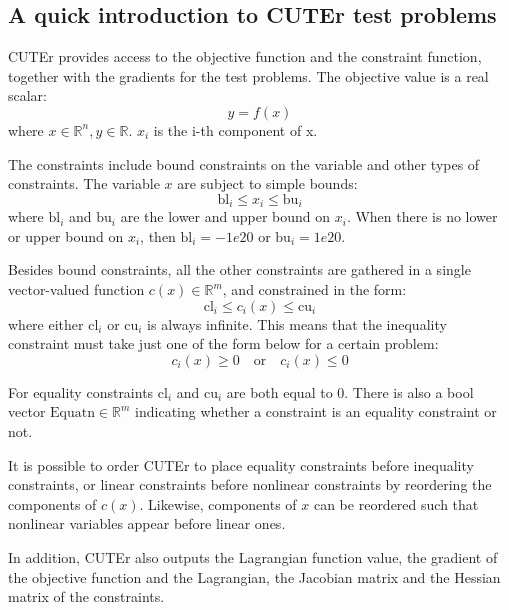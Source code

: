 \subsection{A quick introduction to CUTEr test problems}\label{sec:cuternm}
CUTEr provides access to the objective function and the constraint function, together with the gradients for the test problems. The objective value is a real scalar: 
\begin{equation*}
y = f(x) 
\end{equation*}
where  $x \in \mathbb{R}^n, y \in \mathbb{R}$. $x_i$ is the i-th component of x. 

The constraints include bound constraints on the variable and other types of constraints. The variable $x$ are subject to simple bounds:
\begin{equation*}
\text{bl}_i \leq x_i \leq \text{bu}_i  
\end{equation*}
where $\text{bl}_i$ and $\text{bu}_i$ are the lower and upper bound on $x_i$. When there is no lower or upper bound on $x_i$, then $\text{bl}_i = -1e20$ or $\text{bu}_i = 1e20$. 

Besides bound constraints, all the other constraints are gathered in a single vector-valued function $c(x) \in \mathbb{R}^m$, and constrained in the form:    
\begin{equation*}
\text{cl}_i \leq c_i(x) \leq \text{cu}_i  
\end{equation*}
where either $\text{cl}_i$ or $\text{cu}_i$ is always infinite. This means that the inequality constraint must take just one of the form below for a certain problem:
\begin{equation*}
c_i(x) \geq 0   \quad  \text{or}  \quad  c_i(x) \leq 0
\end{equation*}

For equality constraints $\text{cl}_i$ and $\text{cu}_i$ are both equal to 0. There is also a bool vector $\text{Equatn} \in \mathbb{R}^m$ indicating whether a constraint is an equality constraint or not. 

It is possible to order CUTEr to place equality constraints before inequality constraints, or linear constraints before nonlinear constraints by reordering the components of $c(x)$. Likewise, components of $x$ can be reordered such that nonlinear variables appear before linear ones. 

In addition, CUTEr also outputs the Lagrangian function value, the gradient of the objective function and the Lagrangian, the Jacobian matrix and the Hessian matrix of the constraints. 

